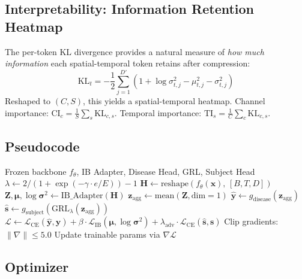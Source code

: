 \documentclass{article}
\newcommand{\mL}{\mathcal{L}}
\newcommand{\bx}{\bm{x}}
\newcommand{\bz}{\bm{z}}
\newcommand{\bmu}{\bm{\mu}}
\newcommand{\bsigma}{\bm{\sigma}}
\begin{document}
\subsection{Interpretability: Information Retention Heatmap}

The per-token KL divergence provides a natural measure of \emph{how much information} each spatial-temporal token retains after compression:
\begin{equation}
\text{KL}_t = -\frac{1}{2} \sum_{j=1}^{D'} \left(1 + \log\sigma^2_{t,j} - \mu^2_{t,j} - \sigma^2_{t,j}\right)
\end{equation}
Reshaped to $(C, S)$, this yields a spatial-temporal heatmap.
Channel importance: $\text{CI}_c = \frac{1}{S}\sum_s \text{KL}_{c,s}$.
Temporal importance: $\text{TI}_s = \frac{1}{C}\sum_c \text{KL}_{c,s}$.

\subsection{Pseudocode}

\begin{algorithm}[H]
\caption{IB + Disentanglement Fine-Tuning}
\begin{algorithmic}[1]
\REQUIRE Frozen backbone $f_\theta$, IB Adapter, Disease Head, GRL, Subject Head
  \STATE $\lambda \leftarrow 2/(1 + \exp(-\gamma \cdot e / E)) - 1$ 
  \FOR{each mini-batch $(\bx, \bm{y}, \bm{s})$}
    \STATE $\bm{H} \leftarrow \text{reshape}(f_\theta(\bx),\, [B, T, D])$ 
    \STATE $\bm{Z}, \bmu, \log\bsigma^2 \leftarrow \text{IB\_Adapter}(\bm{H})$ 
    \STATE $\bz_\text{agg} \leftarrow \text{mean}(\bm{Z}, \text{dim}=1)$
    \STATE $\hat{\bm{y}} \leftarrow g_\text{disease}(\bz_\text{agg})$
    \STATE $\hat{\bm{s}} \leftarrow g_\text{subject}(\text{GRL}_\lambda(\bz_\text{agg}))$
    \STATE $\mL \leftarrow \mL_\text{CE}(\hat{\bm{y}}, \bm{y}) + \beta \cdot \mL_\text{IB}(\bmu, \log\bsigma^2) + \lambda_\text{adv} \cdot \mL_\text{CE}(\hat{\bm{s}}, \bm{s})$
    \STATE Clip gradients: $\|\nabla\| \leq 5.0$
    \STATE Update trainable params via $\nabla \mL$
  \ENDFOR
\ENDFOR
\end{algorithmic}
\end{algorithm}

\subsection{Optimizer}
\end{document}
